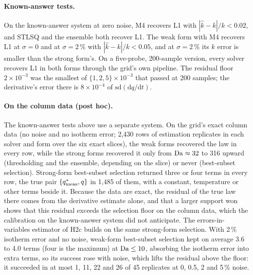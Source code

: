 \paragraph{Known-answer tests.} On the known-answer system at zero noise, M4 recovers L1 with
$|\hat k - k|/k < 0.02$, and STLSQ and the ensemble both recover L1. The weak form with M4
recovers L1 at $\sigma = 0$ and at $\sigma = 2\,\%$ with $|\hat k - k|/k < 0.05$, and at
$\sigma = 2\,\%$ its $k$ error is smaller than the strong form's. On a five-probe, 200-sample
version, every solver recovers L1 in both forms through the grid's own pipeline. The
residual floor $2\times10^{-3}$ was the smallest of $\{1, 2, 5\}\times10^{-3}$ that passed at
200 samples; the derivative's error there is $8\times10^{-4}$ of $\mathrm{sd}(\mathrm{d}q/\mathrm{d}t)$.

\paragraph{On the column data (post hoc).} The known-answer tests above use a separate system. On the
grid's exact column data (no noise and no isotherm error; 2{,}430 rows of estimation replicates in each
solver and form over the six exact slices), the weak forms recovered the law in every row, while the strong
forms recovered it only from $\mathrm{Da} \approx 32$ to 316 upward (thresholding and the ensemble,
depending on the slice) or never (best-subset selection). Strong-form best-subset selection returned three
or four terms in every row, the true pair $\{q^{*}_{\mathrm{meas}}, q\}$ in 1{,}485 of them, with a
constant, temperature or other terms beside it. Because the data are exact, the residual of the true law
there comes from the derivative estimate alone, and that a larger support won shows that this residual
exceeds the selection floor on the column data, which the calibration on the known-answer system did not
anticipate. The errors-in-variables estimator of H2c builds on the same strong-form selection. With
2\,\% isotherm error and no noise, weak-form best-subset selection kept on average 3.6 to 4.0 terms
(four is the maximum) at $\mathrm{Da} \le 10$, absorbing the isotherm error into extra terms, so its
success rose with noise, which lifts the residual above the floor: it succeeded in at most 1, 11, 22 and 26
of 45 replicates at 0, 0.5, 2 and 5\,\% noise.

